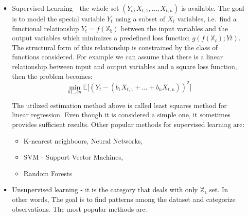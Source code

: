 \documentclass[]{article}
\providecommand{\tightlist}{%
  \setlength{\itemsep}{0pt}\setlength{\parskip}{0pt}}
\begin{document}
\begin{itemize}
\item
  Supervised Learning - the whole set \((Y_t;X_{t, 1}, ..., X_{t,n})\)
  is available. The goal is to model the special variable \(Y_t\) using
  a subset of \(X_t\) variables, i.e.~find a functional relationship
  \(Y_t = f(\mathbb{X_t})\) between the input variables and the output
  variables which minimizes a predefined loss function
  \(g(f(\mathbb{X}_t);Yt)\). The structural form of this relationship is
  constrained by the class of functions considered. For example we can
  assume that there is a linear relationship between input and output
  variables and a square loss function, then the problem becomes:
  \[\min_{b1\dots bn}\mathbb{E[}(Y_t-(b_1X_{t,1}+\dots+b_nX_{t,n}))^2]\]

  The utilized estimation method above is called least squares method
  for linear regression. Even though it is considered a simple one, it
  sometimes provides sufficient results. Other popular methods for
  supervised learning are:

  \begin{itemize}
  \tightlist
  \item
    K-nearest neighboors, Neural Networks,
  \item
    SVM - Support Vector Machines,
  \item
    Random Forests
  \end{itemize}
\item
  Unsupervised learning - it is the category that deals with only
  \(\mathbb{X_t}\) set. In other words, The goal is to find patterns
  among the dataset and categorize observations. The most popular
  methods are:


\end{itemize}
\end{document}
